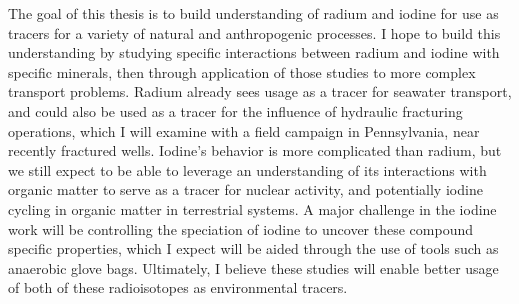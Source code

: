 \documentclass[twoside,12pt,titlepage]{article}
\begin{document}
The goal of this thesis is to build understanding of radium and iodine for use as tracers for a variety of natural and anthropogenic processes. I hope to build this understanding by studying specific interactions between radium and iodine with specific minerals, then through application of those studies to more complex transport problems. Radium already sees usage as a tracer for seawater transport, and could also be used as a tracer for the influence of hydraulic fracturing operations, which I will examine with a field campaign in Pennsylvania, near recently fractured wells. Iodine's behavior is more complicated than radium, but we still expect to be able to leverage an understanding of its interactions with organic matter to serve as a tracer for nuclear activity, and potentially iodine cycling in organic matter in terrestrial systems. A major challenge in the iodine work will be controlling the speciation of iodine to uncover these compound specific properties, which I expect will be aided through the use of tools such as anaerobic glove bags. Ultimately, I believe these studies will enable better usage of both of these radioisotopes as environmental tracers.



\end{document}
